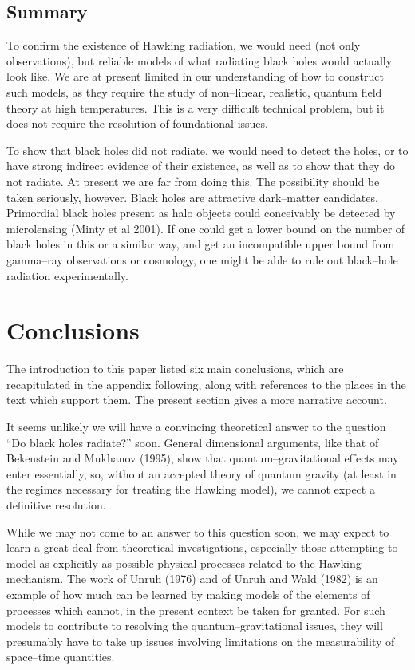 \subsection{Summary}

To confirm the existence of Hawking radiation, we would need (not only
observations), but reliable models of what radiating black holes would actually
look like.  We are at present limited in our understanding of how to construct
such models, as they require the study of non--linear, realistic, quantum field
theory at high temperatures.  This is a very difficult technical problem, but it
does not require the resolution of foundational issues.

To show that black holes did not radiate, we 
would need to detect the holes, or to
have strong indirect evidence of their existence, as well as to show that they
do not radiate.  At present we are far from doing this.  The possibility should
be taken seriously, however.  Black holes are attractive dark--matter
candidates.  Primordial black holes present as halo objects could conceivably be
detected by microlensing (Minty et al 2001).  If one could get a lower bound on
the number of black holes in this or a similar way, and get an incompatible
upper bound from gamma--ray observations or cosmology, one might be able to rule
out black--hole radiation experimentally.


\section{Conclusions}

The introduction to this paper listed six main conclusions, which are
recapitulated in the appendix following, along with references to the
places in the text which support them.  The present section gives a
more narrative account.

It seems unlikely we will have a convincing theoretical answer to the question
``Do black holes radiate?'' soon.  General dimensional
arguments, like that of Bekenstein and Mukhanov (1995), show that
quantum--gravitational effects may enter essentially, so, without an accepted
theory of quantum gravity (at least in the regimes necessary for treating the
Hawking model), we cannot expect a definitive resolution.

While we may not come to an answer to this question soon, we may expect to
learn a great deal from theoretical investigations, especially those attempting
to model as explicitly as possible physical processes related to the Hawking
mechanism.  The work of Unruh (1976) and of Unruh and Wald (1982) is an example
of how much can be learned by making models of the elements of processes which
cannot, in the present context be taken for granted.  
For such models to contribute to resolving the quantum--gravitational issues,
they will presumably have to take up issues involving limitations on the
measurability of space--time quantities.

